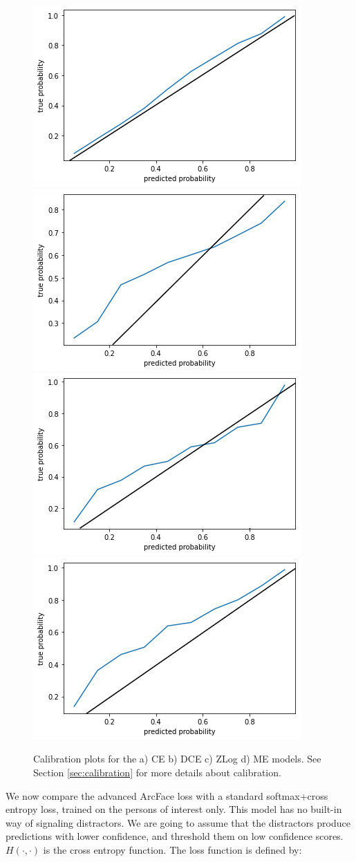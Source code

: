 \begin{figure}
    \centering
    \includegraphics[width=0.45\columnwidth]{50-files/ce-calibration.png}
    \includegraphics[width=0.45\columnwidth]{50-files/dce-calibration.png}
    \includegraphics[width=0.45\columnwidth]{50-files/zlog-calibration.png}
    \includegraphics[width=0.45\columnwidth]{50-files/me-calibration.png}
    \caption{Calibration plots for the a) CE b) DCE c) ZLog d) ME models. See Section \ref{sec:calibration} for more details about calibration.}
    \label{fig:fr-calibration-plots}
\end{figure}

We now compare the advanced ArcFace loss with a standard softmax+cross entropy loss, trained on the persons of interest only. This model has no built-in way of signaling distractors. We are going to assume that the distractors produce predictions with lower confidence, and threshold them on low confidence scores. $H(\cdot, \cdot)$ is the cross entropy function. The loss function is defined by:

